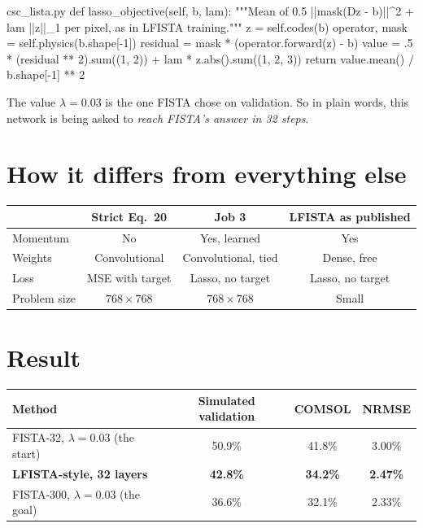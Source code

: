 \begin{code*}{csc_lista.py}
    def lasso_objective(self, b, lam):
        """Mean of 0.5 ||mask(Dz - b)||^2 + lam ||z||_1 per pixel, as in LFISTA training."""
        z = self.codes(b)
        operator, mask = self.physics(b.shape[-1])
        residual = mask * (operator.forward(z) - b)
        value = .5 * (residual ** 2).sum((1, 2)) + lam * z.abs().sum((1, 2, 3))
        return value.mean() / b.shape[-1] ** 2
\end{code*}

The value $\lambda=0.03$ is the one FISTA chose on validation. So in plain words, this network is being asked to
\emph{reach FISTA's answer in 32 steps}.

\section{How it differs from everything else}

\begin{center}
\begin{tabular}{lccc}
\toprule
 & Strict Eq.~20 & Job 3 & LFISTA as published \\
\midrule
Momentum & No & Yes, learned & Yes \\
Weights & Convolutional & Convolutional, tied & Dense, free \\
Loss & MSE with target & Lasso, no target & Lasso, no target \\
Problem size & $768\times768$ & $768\times768$ & Small \\
\bottomrule
\end{tabular}
\end{center}

\section{Result}

\begin{center}
\begin{tabular}{lccc}
\toprule
Method & Simulated validation & COMSOL & NRMSE \\
\midrule
FISTA-32, $\lambda=0.03$ (the start) & 50.9\% & 41.8\% & 3.00\% \\
\textbf{LFISTA-style, 32 layers} & \textbf{42.8\%} & \textbf{34.2\%} & \textbf{2.47\%} \\
FISTA-300, $\lambda=0.03$ (the goal) & 36.6\% & 32.1\% & 2.33\% \\
\bottomrule
\end{tabular}
\end{center}

